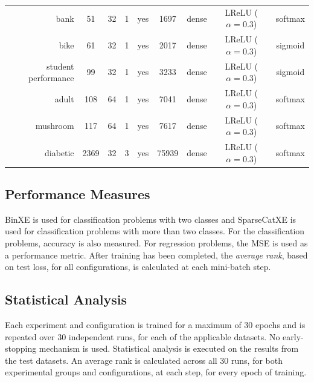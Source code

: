 \begin{table}[htb]
{\begin{tabular}{rcccccccc}
			bank                & 51              & 32              & 1               & yes             & 1697                & dense             & LReLU ($\alpha = 0.3$) & softmax                \\
			bike                & 61              & 32              & 1               & yes             & 2017                & dense             & LReLU ($\alpha = 0.3$) & sigmoid                \\
			student performance & 99              & 32              & 1               & yes             & 3233                & dense             & LReLU ($\alpha = 0.3$) & sigmoid                \\
			adult               & 108             & 64              & 1               & yes             & 7041                & dense             & LReLU ($\alpha = 0.3$) & softmax                \\
			mushroom            & 117             & 64              & 1               & yes             & 7617                & dense             & LReLU ($\alpha = 0.3$) & softmax                \\
			diabetic            & 2369            & 32              & 3               & yes             & 75939               & dense             & LReLU ($\alpha = 0.3$) & softmax                \\
		\end{tabular}%
	}
\end{table}%


\subsection{Performance Measures}\label{sec:methodology:performance_measures}

\Acf{BinXE} is used for classification problems with two classes and \acf{SparseCatXE} is used for classification problems with more than two classes. For the classification problems, accuracy is also measured. For regression problems, the \acf{MSE} is used as a performance metric. After training has been completed, the \textit{average rank}, based on test loss, for all configurations, is calculated at each mini-batch step.


\subsection{Statistical Analysis}
\label{sec:methodology:statistical_analysis}

Each experiment and configuration is trained for a maximum of 30 epochs and is repeated over 30 independent runs, for each of the applicable datasets. No early-stopping mechanism is used. Statistical analysis is executed on the results from the test datasets. An average rank is calculated across all 30 runs, for both experimental groups and configurations, at each step, for every epoch of training.

